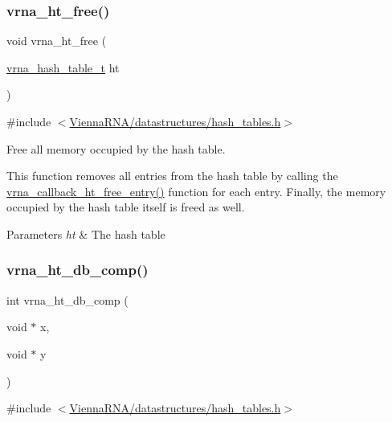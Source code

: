 \subsubsection{\texorpdfstring{vrna\_ht\_free()}{vrna\_ht\_free()}}
{\footnotesize\ttfamily void vrna\+\_\+ht\+\_\+free (\begin{DoxyParamCaption}\item[{\mbox{\hyperlink{group__hash__table__utils_gabc7c6f41b718c8e23929e528891a89c4}{vrna\+\_\+hash\+\_\+table\+\_\+t}}}]{ht }\end{DoxyParamCaption})}



{\ttfamily \#include $<$\mbox{\hyperlink{hash__tables_8h}{Vienna\+R\+N\+A/datastructures/hash\+\_\+tables.\+h}}$>$}



Free all memory occupied by the hash table. 

This function removes all entries from the hash table by calling the \mbox{\hyperlink{group__hash__table__utils_ga3ff18cc70db8bb6f8cfee2c2b1542afc}{vrna\+\_\+callback\+\_\+ht\+\_\+free\+\_\+entry()}} function for each entry. Finally, the memory occupied by the hash table itself is free\textquotesingle{}d as well.


\begin{DoxyParams}{Parameters}
{\em ht} & The hash table \\
\hline
\end{DoxyParams}
\mbox{\label{group__hash__table__utils_gac4ec0b8372d50d7347a63f140f340962}} 
\subsubsection{\texorpdfstring{vrna\_ht\_db\_comp()}{vrna\_ht\_db\_comp()}}
{\footnotesize\ttfamily int vrna\+\_\+ht\+\_\+db\+\_\+comp (\begin{DoxyParamCaption}\item[{void $\ast$}]{x,  }\item[{void $\ast$}]{y }\end{DoxyParamCaption})}



{\ttfamily \#include $<$\mbox{\hyperlink{hash__tables_8h}{Vienna\+R\+N\+A/datastructures/hash\+\_\+tables.\+h}}$>$}



